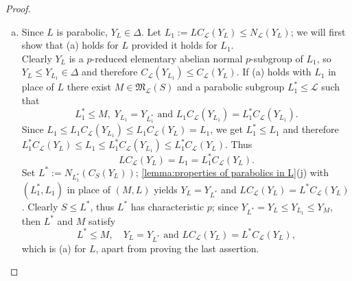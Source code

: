 \documentclass{amsart}
\numberwithin{equation}{section}
\theoremstyle{definition}
\theoremstyle{subresult}
\theoremstyle{caseresult}
\newcommand{\gM}{\mathfrak{M}}
\renewcommand{\L}{\mathcal{L}}
\newcommand{\<}{\langle}
\renewcommand{\>}{\rangle}
\begin{document}
\begin{proof}
	\begin{enumerate}[(a)]
		\item Since $L$ is parabolic, $Y_L \in \Delta$. Let $L_1:=LC_\L(Y_L) \le N_\L(Y_L)$; we will first show that (a) holds for $L$ provided it holds for $L_1$.\\
		Clearly $Y_L$ is a $p$-reduced elementary abelian normal $p$-subgroup of $L_1$, so $Y_L \le Y_{L_1} \in \Delta$ and therefore $C_\L(Y_{L_1}) \le C_\L(Y_L)$. If (a) holds with $L_1$ in place of $L$ there exist $M \in \gM_\L(S)$ and a parabolic subgroup $L_1^* \le \L$ such that
		\[
		L_1^* \le M, \; Y_{L_1} = Y_{L_1^*} \text{ and } L_1C_\L(Y_{L_1}) = L_1^* C_\L(Y_{L_1}).
		\]
		Since $L_1 \le L_1C_\L(Y_{L_1}) \le L_1 C_\L(Y_L) = L_1$, we get $L_1^* \le L_1$ and therefore $L_1^* C_\L(Y_L) \le L_1  \le L_1^* C_\L(Y_{L_1}) \le L_1^* C_\L(Y_L)$. Thus
		\[
		LC_\L(Y_L) = L_1 = L_1^*C_\L(Y_L).
		\]
		Set $L^*:= N_{L_1^*}(C_S(Y_L))$; \ref{lemma:properties of parabolics in L}(j) with $(L_1^*,L_1)$ in place of $(M,L)$ yields $Y_L = Y_{L^*}$ and $LC_\L(Y_L)=L^*C_\L(Y_L)$. Clearly $S \le L^*$, thus $L^*$ has characteristic $p$; since $Y_{L^*} =Y_L \le Y_{L_1} \le Y_M$, then $L^*$ and $M$ satisfy
		\[
		L^* \le M, \quad Y_L=Y_{L^*} \text{ and } LC_\L(Y_L) = L^*C_\L(Y_L),
		\]
		which is (a) for $L$, apart from proving the last assertion.\\
		

\end{enumerate}
\end{proof}
\end{document}
